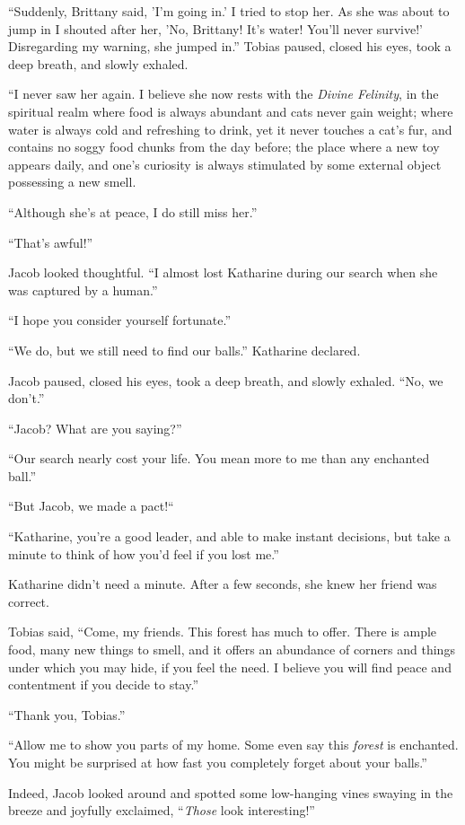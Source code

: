 “Suddenly, Brittany said, 'I'm going in.' I tried to stop her. As she was about to jump in I shouted after her, 'No, Brittany! It's water! You'll never survive!' Disregarding my warning, she jumped in.” Tobias paused, closed his eyes, took a deep breath, and slowly exhaled.

“I never saw her again. I believe she now rests with the \textit{Divine Felinity}, in the spiritual realm where food is always abundant and cats never gain weight; where water is always cold and refreshing to drink, yet it never touches a cat's fur, and contains no soggy food chunks from the day before; the place where a new toy appears daily, and one's curiosity is always stimulated by some external object possessing a new smell.

“Although she's at peace, I do still miss her.”

“That's awful!”

Jacob looked thoughtful. “I almost lost Katharine during our search when she was captured by a human.”

“I hope you consider yourself fortunate.”

“We do, but we still need to find our balls.” Katharine declared.

Jacob paused, closed his eyes, took a deep breath, and slowly exhaled. “No, we don't.”

“Jacob? What are you saying?”

“Our search nearly cost your life. You mean more to me than any enchanted ball.”

“But Jacob, we made a pact!“

“Katharine, you're a good leader, and able to make instant decisions, but take a minute to think of how you'd feel if you lost me.”

Katharine didn't need a minute. After a few seconds, she knew her friend was correct.

Tobias said, “Come, my friends. This forest has much to offer. There is ample food, many new things to smell, and it offers an abundance of corners and things under which you may hide, if you feel the need. I believe you will find peace and contentment if you decide to stay.”

“Thank you, Tobias.”

“Allow me to show you parts of my home. Some even say this \textit{forest} is enchanted. You might be surprised at how fast you completely forget about your balls.”

Indeed, Jacob looked around and spotted some low-hanging vines swaying in the breeze and joyfully exclaimed, “\textit{Those} look interesting!”